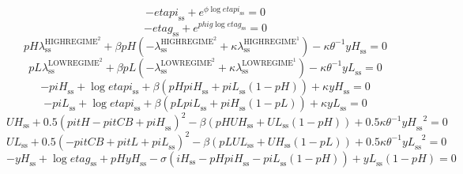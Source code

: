 \begin{equation}
-{e\!t\!a\!p\!i}_\mathrm{ss} + e^{{\phi} {\log{{e\!t\!a\!p\!i}_\mathrm{ss}}}} = 0
\end{equation}
\begin{equation}
-{e\!t\!a\!g}_\mathrm{ss} + e^{{{p\!h\!i\!g}} {\log{{e\!t\!a\!g}_\mathrm{ss}}}} = 0
\end{equation}
\begin{equation}
{{p\!H}} {\lambda^{\mathrm{HIGHREGIME}^{\mathrm{2}}}_\mathrm{ss}} + {\beta} {{p\!H}} \left(-\lambda^{\mathrm{HIGHREGIME}^{\mathrm{2}}}_\mathrm{ss} + {\kappa} {\lambda^{\mathrm{HIGHREGIME}^{\mathrm{1}}}_\mathrm{ss}}\right) - {\kappa} {\theta}^{-1} {{y\!H}_\mathrm{ss}} = 0
\end{equation}
\begin{equation}
{{p\!L}} {\lambda^{\mathrm{LOWREGIME}^{\mathrm{2}}}_\mathrm{ss}} + {\beta} {{p\!L}} \left(-\lambda^{\mathrm{LOWREGIME}^{\mathrm{2}}}_\mathrm{ss} + {\kappa} {\lambda^{\mathrm{LOWREGIME}^{\mathrm{1}}}_\mathrm{ss}}\right) - {\kappa} {\theta}^{-1} {{y\!L}_\mathrm{ss}} = 0
\end{equation}
\begin{equation}
-{p\!i\!H}_\mathrm{ss} + \log{{e\!t\!a\!p\!i}_\mathrm{ss}} + {\beta} \left({{p\!H}} {{p\!i\!H}_\mathrm{ss}} + {{p\!i\!L}_\mathrm{ss}} \left(1 - {p\!H}\right)\right) + {\kappa} {{y\!H}_\mathrm{ss}} = 0
\end{equation}
\begin{equation}
-{p\!i\!L}_\mathrm{ss} + \log{{e\!t\!a\!p\!i}_\mathrm{ss}} + {\beta} \left({{p\!L}} {{p\!i\!L}_\mathrm{ss}} + {{p\!i\!H}_\mathrm{ss}} \left(1 - {p\!L}\right)\right) + {\kappa} {{y\!L}_\mathrm{ss}} = 0
\end{equation}
\begin{equation}
{U\!H}_\mathrm{ss} + 0.5\left({p\!i\!t\!H} - {p\!i\!t\!C\!B} + {p\!i\!H}_\mathrm{ss}\right)^{2} - {\beta} \left({{p\!H}} {{U\!H}_\mathrm{ss}} + {{U\!L}_\mathrm{ss}} \left(1 - {p\!H}\right)\right) + 0.5{\kappa} {\theta}^{-1} {{y\!H}_\mathrm{ss}}^{2} = 0
\end{equation}
\begin{equation}
{U\!L}_\mathrm{ss} + 0.5\left(-{p\!i\!t\!C\!B} + {p\!i\!t\!L} + {p\!i\!L}_\mathrm{ss}\right)^{2} - {\beta} \left({{p\!L}} {{U\!L}_\mathrm{ss}} + {{U\!H}_\mathrm{ss}} \left(1 - {p\!L}\right)\right) + 0.5{\kappa} {\theta}^{-1} {{y\!L}_\mathrm{ss}}^{2} = 0
\end{equation}
\begin{equation}
-{y\!H}_\mathrm{ss} + \log{{e\!t\!a\!g}_\mathrm{ss}} + {{p\!H}} {{y\!H}_\mathrm{ss}} - {\sigma} \left({i\!H}_\mathrm{ss} - {{p\!H}} {{p\!i\!H}_\mathrm{ss}} - {{p\!i\!L}_\mathrm{ss}} \left(1 - {p\!H}\right)\right) + {{y\!L}_\mathrm{ss}} \left(1 - {p\!H}\right) = 0
\end{equation}
